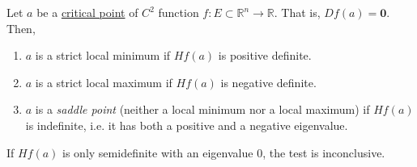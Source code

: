   \begin{theorem}
    \label{thm:2nd-derivative-test}
    Let $a$ be a \hyperref[real-def:critical-point]{critical point} of $C^2$ function $f: E \subset \mathbb{R}^n \to \mathbb{R}$. That is, $D f(a) = \mathbf{0}$. Then, 
    \begin{enumerate}
      \item $a$ is a strict local minimum if $H f(a)$ is positive definite.
      \item $a$ is a strict local maximum if $H f(a)$ is negative definite. 
			\item $a$ is a \textit{saddle point} (neither a local minimum nor a local maximum) if $H f(a)$ is indefinite, i.e. it has both a positive and a negative eigenvalue.
    \end{enumerate}
    If $H f(a)$ is only semidefinite with an eigenvalue $0$, the test is inconclusive. 
  \end{theorem}
